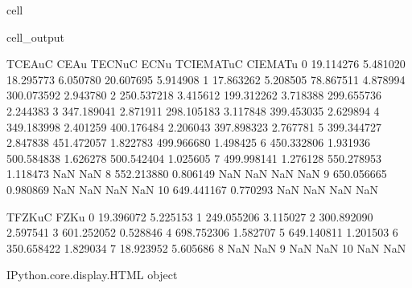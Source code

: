 \documentclass[letterpaper,10pt,english]{jupyterBook}
\begin{document}
\begin{sphinxuseclass}{cell}
\begin{sphinxVerbatimOutput}
			\begin{sphinxuseclass}{cell_output}
				\begin{sphinxVerbatim}[commandchars=\\\{\}]
					T\PYGZus{}CEA\PYGZus{}uC     CEA\PYGZus{}u    T\PYGZus{}ECN\PYGZus{}uC     ECN\PYGZus{}u  T\PYGZus{}CIEMAT\PYGZus{}uC  CIEMAT\PYGZus{}u  \PYGZbs{}
					0    19.114276  5.481020   18.295773  6.050780    20.607695  5.914908   
					1    17.863262  5.208505   78.867511  4.878994   300.073592  2.943780   
					2   250.537218  3.415612  199.312262  3.718388   299.655736  2.244383   
					3   347.189041  2.871911  298.105183  3.117848   399.453035  2.629894   
					4   349.183998  2.401259  400.176484  2.206043   397.898323  2.767781   
					5   399.344727  2.847838  451.472057  1.822783   499.966680  1.498425   
					6   450.332806  1.931936  500.584838  1.626278   500.542404  1.025605   
					7   499.998141  1.276128  550.278953  1.118473          NaN       NaN   
					8   552.213880  0.806149         NaN       NaN          NaN       NaN   
					9   650.056665  0.980869         NaN       NaN          NaN       NaN   
					10  649.441167  0.770293         NaN       NaN          NaN       NaN   
					
					T\PYGZus{}FZK\PYGZus{}uC     FZK\PYGZus{}u  
					0    19.396072  5.225153  
					1   249.055206  3.115027  
					2   300.892090  2.597541  
					3   601.252052  0.528846  
					4   698.752306  1.582707  
					5   649.140811  1.201503  
					6   350.658422  1.829034  
					7    18.923952  5.605686  
					8          NaN       NaN  
					9          NaN       NaN  
					10         NaN       NaN  
				\end{sphinxVerbatim}
				
				\begin{sphinxVerbatim}[commandchars=\\\{\}]
					\PYGZlt{}IPython.core.display.HTML object\PYGZgt{}
				\end{sphinxVerbatim}
				
				\sphinxAtStartPar
				

\end{sphinxuseclass}
\end{sphinxVerbatimOutput}
\end{sphinxuseclass}
\end{document}
